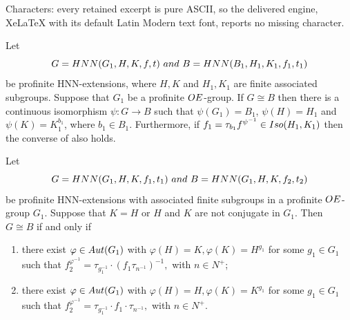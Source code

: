\documentclass[10pt,a4paper]{amsart}
\def\Iso {{\rm Iso}}
\def\OE{{\rm OE}}
\def\aut {{\rm Aut}}
\def\hnn {{\rm HNN}}
\begin{document}
Characters: every retained excerpt is pure ASCII, so the delivered engine, XeLaTeX with its default Latin Modern text font, reports no missing character.
\begin{prop}\label{2a} Let $$G = \hnn(G_{1}, H,K, f, t)\  {\rm and}\  B = \hnn(B_{1}, H_1, K_1, f_1,\\ t_1)$$ be profinite HNN-extensions, where $H, K$ and $H_1, K_1$ are finite associated subgroups.  Suppose that $G_1$ be a profinite  $\OE$-group.  If $G\cong B$ then there is a continuous isomorphism $\psi: G \longrightarrow B$ such that $\psi(G_1)= B_1$, $\psi(H)=H_1$ and $\psi(K)= K_{1}^{b_1}$, where $ b_1\in B_1$. Furthermore, if $f_1=\tau_{b_1}f^{\psi^{-1}}\in \Iso(H_1,K_1)$ then the converse of also holds.
\end{prop}

\begin{prop}\label{nonnormalhnnprof} Let $$G= \hnn(G_1, H, K, f_1, t_1)\  {\rm and}\  B=\hnn(G_1, H, K, f_2, t_2)$$ be profinite HNN-extensions with associated finite subgroups in a profinite $\OE$-group $G_1$. Suppose that $K=H$ or $H$ and $K$ are not conjugate in $G_1$. Then $G\cong B$ if and only if 

\begin{enumerate}
\item [(i)] there exist $\varphi\in \aut(G_1)$ with $\varphi(H)=K, \varphi(K)=H^{g_1}$ for some $g_1 \in G_1$ such that $ f_2^{\varphi^{-1}} = \tau_{g_1^{-1}} \cdot  (f_1\tau_{n^{-1}})^{-1},$ with  $n\in N^{+}$;
\item [(ii)] there exist $\varphi\in \aut(G_1)$ with $\varphi(H)=H, \varphi(K)=K^{g_1}$ for some $g_1 \in G_1$ such that $f_2^{\varphi^{-1}} = \tau_{g_1^{-1}} \cdot f_1 \cdot \tau_{n^{-1}} ,$ with $n\in N^{+}$.
\end{enumerate}
\end{prop}
\end{document}
